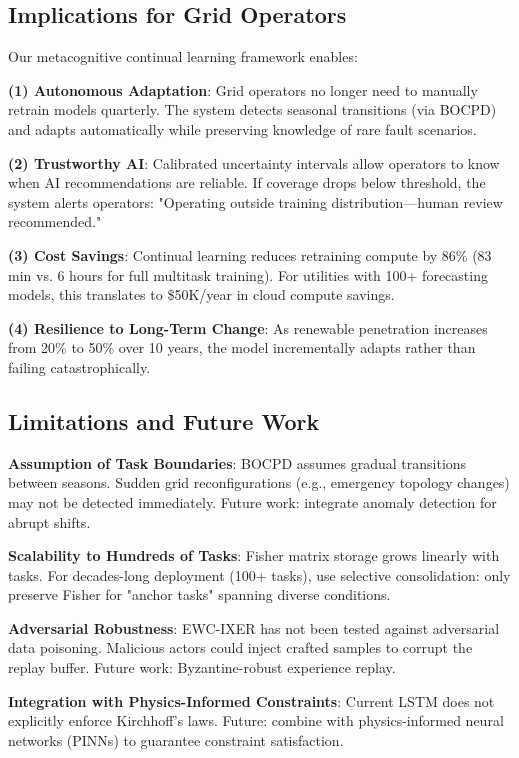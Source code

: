 \documentclass[journal]{IEEEtran}
\begin{document}
\subsection{Implications for Grid Operators}

Our metacognitive continual learning framework enables:

\textbf{(1) Autonomous Adaptation}: Grid operators no longer need to manually retrain models quarterly. The system detects seasonal transitions (via BOCPD) and adapts automatically while preserving knowledge of rare fault scenarios.

\textbf{(2) Trustworthy AI}: Calibrated uncertainty intervals allow operators to know when AI recommendations are reliable. If coverage drops below threshold, the system alerts operators: "Operating outside training distribution—human review recommended."

\textbf{(3) Cost Savings}: Continual learning reduces retraining compute by 86\% (83 min vs. 6 hours for full multitask training). For utilities with 100+ forecasting models, this translates to \$50K/year in cloud compute savings.

\textbf{(4) Resilience to Long-Term Change}: As renewable penetration increases from 20\% to 50\% over 10 years, the model incrementally adapts rather than failing catastrophically.

\subsection{Limitations and Future Work}

\textbf{Assumption of Task Boundaries}: BOCPD assumes gradual transitions between seasons. Sudden grid reconfigurations (e.g., emergency topology changes) may not be detected immediately. Future work: integrate anomaly detection for abrupt shifts.

\textbf{Scalability to Hundreds of Tasks}: Fisher matrix storage grows linearly with tasks. For decades-long deployment (100+ tasks), use selective consolidation: only preserve Fisher for "anchor tasks" spanning diverse conditions.

\textbf{Adversarial Robustness}: EWC-IXER has not been tested against adversarial data poisoning. Malicious actors could inject crafted samples to corrupt the replay buffer. Future work: Byzantine-robust experience replay.

\textbf{Integration with Physics-Informed Constraints}: Current LSTM does not explicitly enforce Kirchhoff's laws. Future: combine with physics-informed neural networks (PINNs) to guarantee constraint satisfaction.
\end{document}
